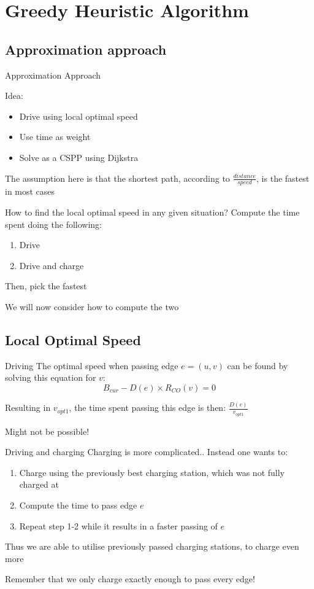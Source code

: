 \section{Greedy Heuristic Algorithm}

\subsection{Approximation approach}
\begin{frame}{Approximation Approach}

  Idea:
  \begin{itemize}
    \item Drive using local optimal speed
    \item Use time as weight
    \item Solve as a CSPP using Dijkstra
  \end{itemize}
  The assumption here is that the shortest path, according to $\frac{distance}{speed}$, is the fastest in most cases
\end{frame}

\begin{frame}
  How to find the local optimal speed in any given situation?
  Compute the time spent doing the following:
  \begin{enumerate}
    \item Drive
    \item Drive and charge
  \end{enumerate}
  Then, pick the fastest

  We will now consider how to compute the two

\end{frame}
\subsection{Local Optimal Speed}
\begin{frame}{Driving}
  The optimal speed when passing edge $e=(u,v)$ can be found by solving this equation for $v$:
  \[B_{cur} - D(e) \times R_{CO}(v)=0\]

  Resulting in $v_{opt1}$, the time spent passing this edge is then: $\frac{D(e)}{v_{opt1}}$

  Might not be possible!
\end{frame}
\begin{frame}{Driving and charging}
Charging is more complicated.. Instead one wants to:

\begin{enumerate}
    \item Charge using the previously best charging station, which was not fully charged at
    \item Compute the time to pass edge $e$
    \item Repeat step 1-2 while it results in a faster passing of $e$
  \end{enumerate}

  Thus we are able to utilise previously passed charging stations, to charge even more

  Remember that we only charge exactly enough to pass every edge!
\end{frame}

